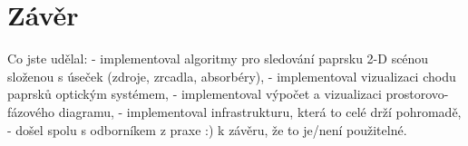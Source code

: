 \chapter{Závěr}

Co jste udělal:
- implementoval algoritmy pro sledování paprsku 2-D scénou složenou s
úseček (zdroje, zrcadla, absorbéry),
- implementoval vizualizaci chodu paprsků optickým systémem,
- implementoval výpočet a vizualizaci prostorovo-fázového diagramu,
- implementoval infrastrukturu, která to celé drží pohromadě,
- došel spolu s odborníkem z praxe :) k závěru, že to je/není použitelné.
